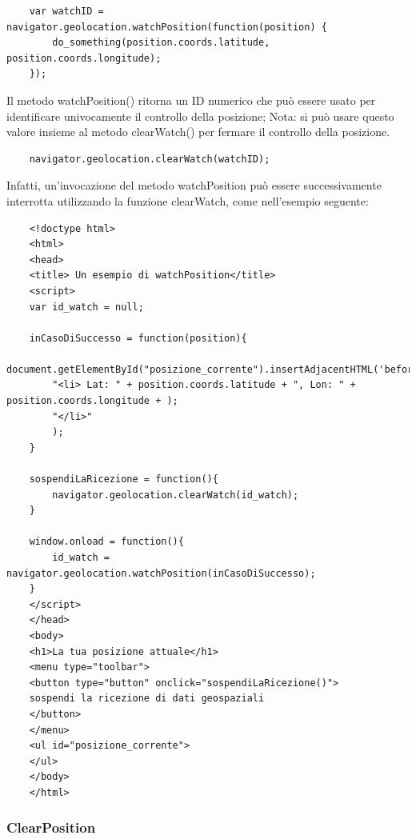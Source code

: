 \documentclass[italian]{article}
\begin{document}
	\begin{lstlisting}
	var watchID = navigator.geolocation.watchPosition(function(position) {
		do_something(position.coords.latitude, position.coords.longitude);
	});
	\end{lstlisting}
	\begin{flushleft}
	Il metodo watchPosition() ritorna un ID numerico che può essere usato per identificare univocamente il controllo della posizione; 
	Nota: si può usare questo valore insieme al metodo clearWatch() per fermare il controllo della posizione.
	\end{flushleft}
	\begin{lstlisting}
	navigator.geolocation.clearWatch(watchID);
	\end{lstlisting}
	\begin{flushleft}
	Infatti, un'invocazione del metodo watchPosition può essere successivamente interrotta utilizzando la funzione clearWatch, 
	come nell’esempio seguente:
	\end{flushleft}
	\begin{lstlisting}
	<!doctype html> 
	<html> 
	<head>
	<title> Un esempio di watchPosition</title> 
	<script> 
	var id_watch = null;
	
	inCasoDiSuccesso = function(position){ 
		document.getElementById("posizione_corrente").insertAdjacentHTML('beforeend',
		"<li> Lat: " + position.coords.latitude + ", Lon: " + position.coords.longitude + );
		"</li>"
		);
	}
	
	sospendiLaRicezione = function(){ 
		navigator.geolocation.clearWatch(id_watch);
	}
	
	window.onload = function(){ 
		id_watch = navigator.geolocation.watchPosition(inCasoDiSuccesso);
	}
	</script> 
	</head>
	<body> 
	<h1>La tua posizione attuale</h1> 
	<menu type="toolbar">
	<button type="button" onclick="sospendiLaRicezione()"> 
	sospendi la ricezione di dati geospaziali
	</button> 
	</menu>
	<ul id="posizione_corrente">
	</ul> 
	</body>
	</html>
	\end{lstlisting}
	
	\subsubsection{ClearPosition}
	
\end{document}
